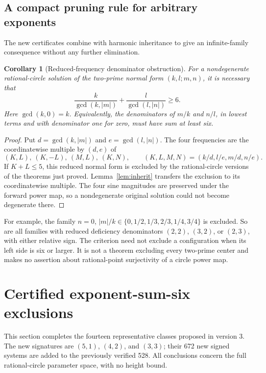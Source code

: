 \documentclass[11pt]{article}
\newtheorem{corollary}[theorem]{Corollary}
\theoremstyle{definition}\newtheorem{definition}[theorem]{Definition}
\theoremstyle{remark}\newtheorem{remark}[theorem]{Remark}
\begin{document}
\subsection{A compact pruning rule for arbitrary exponents}
The new certificates combine with harmonic inheritance to give an infinite-family consequence without any further elimination.
\begin{corollary}[Reduced-frequency denominator obstruction]\label{cor:reduced5}
For a nondegenerate rational-circle solution of the two-prime normal form $(k,l;m,n)$, it is necessary that
\begin{equation}\label{eq:gcdcriterion5}
\boxed{\frac{k}{\gcd(k,|m|)}+\frac{l}{\gcd(l,|n|)}\ge6.}
\end{equation}
Here $\gcd(k,0)=k$. Equivalently, the denominators of $m/k$ and $n/l$, in lowest terms and with denominator one for zero, must have sum at least six.
\end{corollary}
\begin{proof}
Put $d=\gcd(k,|m|)$ and $e=\gcd(l,|n|)$. The four frequencies are the coordinatewise multiple by $(d,e)$ of
\[
(K,L),\ (K,-L),\ (M,L),\ (K,N),\qquad
(K,L,M,N)=(k/d,l/e,m/d,n/e).
\]
If $K+L\le5$, this reduced normal form is excluded by the rational-circle versions of the theorems just proved. Lemma~\ref{lem:inherit} transfers the exclusion to its coordinatewise multiple. The four sine magnitudes are preserved under the forward power map, so a nondegenerate original solution could not become degenerate there.
\end{proof}
For example, the family $n=0$, $|m|/k\in\{0,1/2,1/3,2/3,1/4,3/4\}$ is excluded. So are all families with reduced deficiency denominators $(2,2)$, $(3,2)$, or $(2,3)$, with either relative sign. The criterion need not exclude a configuration when its left side is six or larger. It is not a theorem excluding every two-prime center and makes no assertion about rational-point surjectivity of a circle power map.

\section{Certified exponent-sum-six exclusions}\label{sec:degree6}
This section completes the fourteen representative classes proposed in version 3. The new signatures are $(5,1)$, $(4,2)$, and $(3,3)$; their 672 new signed systems are added to the previously verified 528. All conclusions concern the full rational-circle parameter space, with no height bound.
\end{document}
